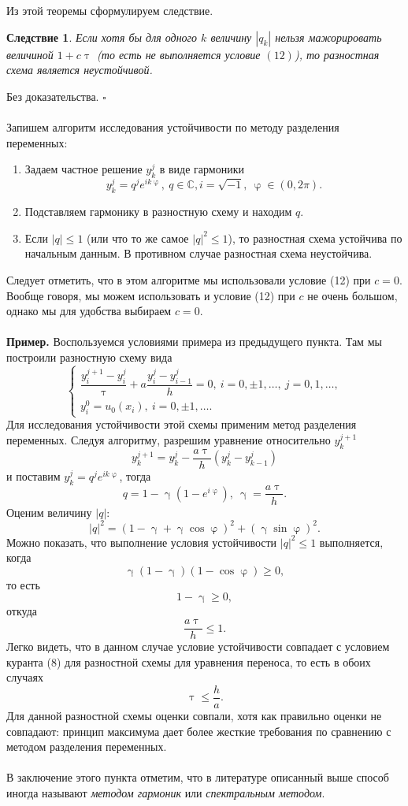 \documentclass[a4paper, 12pt]{report}
\numberwithin{equation}{section}
\newenvironment{Proof} %
{\par\noindent{$\blacklozenge$}} %
{\hfill$\scriptstyle\square$}
\newcommand{\Cm}{\mathbb{C}}
\renewcommand{\leq}{\leqslant}
\renewcommand{\geq}{\geqslant}
\renewcommand{\gamma}{\upgamma}
\renewcommand{\varphi}{\upvarphi}
\renewcommand{\tau}{\uptau}
\newtheorem*{cor}{Следствие}
\begin{document}
		 Из этой теоремы сформулируем следствие.
		 \begin{cor}
		 	Если хотя бы для одного $k$ величину $|q_k|$ нельзя мажорировать величиной $1+c\tau$ (то есть не выполняется условие $(12)$), то разностная схема является неустойчивой. 
		 \end{cor}
		 \begin{Proof}
		 	Без доказательства.
		 \end{Proof}\\\\
		 Запишем алгоритм исследования устойчивости по методу разделения переменных:
		 \begin{enumerate}
		 	\item Задаем частное решение $y_k^j$ в виде гармоники $$y_k^j = q^j e^{ik\varphi },\ q \in \Cm, i = \sqrt{-1},\ \varphi\in (0,2\pi).$$
		 	\item Подставляем гармонику в разностную схему и находим $q$.
		 	\item Если $|q|\leq 1$ (или что то же самое $|q| ^2 \leq 1$), то разностная схема устойчива по начальным данным. В противном случае разностная схема неустойчива. 
		 \end{enumerate}
		 Следует отметить, что в этом алгоритме мы использовали условие (12) при $c=0$. Вообще говоря, мы можем использовать и условие (12) при $c$ не очень большом, однако мы для удобства выбираем $c=0$.
		 \\\\
		 \textbf{Пример.} Воспользуемся условиями примера из предыдущего пункта. Там мы построили разностную схему вида
		 $$\begin{cases}
		 	\dfrac{y_i^{j+1}-y_i^j}{\tau} + a \dfrac{y_i^j - y_{i-1}^j}{h} = 0,\ i =0,\pm1,\ldots,\ j = 0,1,\ldots,\\
		 	y_i^0 = u_0(x_i),\ i =0,\pm1,\ldots.
		 \end{cases}$$
		 Для исследования устойчивости этой схемы применим метод разделения переменных. Следуя алгоритму, разрешим уравнение относительно $y_k^{j+1}$
		 $$y_k^{j+1} = y_k^j - \dfrac {a\tau}h (y_k^j - y_{k-1}^j)$$
		 и поставим $y_k^j = q^j e^{ik \varphi}$, тогда 
		 $$q = 1 - \gamma(1 - e^{i\varphi}), \ \gamma = \dfrac {a\tau}h.$$
		 Оценим величину $|q|$:
		 $$|q|^2 = (1-\gamma + \gamma \cos \varphi)^2 + (\gamma \sin \varphi)^2.$$
		 Можно показать, что выполнение условия устойчивости $|q|^2\leq 1$ выполняется, когда
		 $$\gamma(1-\gamma)(1-\cos \varphi)\geq 0,$$
		 то есть $$1 - \gamma \geq 0,$$
		 откуда
		 $$\dfrac {a\tau}h \leq 1.$$
		 Легко видеть, что в данном случае условие устойчивости совпадает с условием куранта (8) для разностной схемы для уравнения переноса, то есть
		 в обоих случаях
		 $$\tau \leq \dfrac h a.$$
		 Для данной разностной схемы оценки совпали, хотя как правильно оценки не совпадают: принцип максимума дает более жесткие требования по сравнению с методом разделения переменных.\\\\
		 В заключение этого пункта отметим, что в литературе описанный выше способ иногда называют \textit{методом гармоник} или \textit{спектральным методом}.
\end{document}
